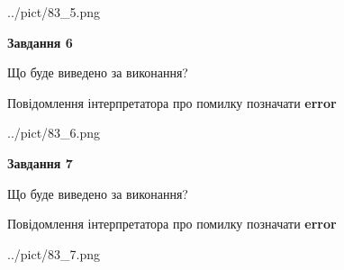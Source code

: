 \documentclass[10pt, ukrainian]{article}
\begin{document}
{\begin {large}
\begin{center}
	{../pict/83_5.png}
\end{center}
\newpage

{\begin {center}\textbf{Завдання 6}\end {center}}\par
Що буде виведено за виконання? \par
Повідомлення інтерпретатора про помилку позначати \textbf{error}

\begin{center}
	{../pict/83_6.png}
\end{center}
\newpage

{\begin {center}\textbf{Завдання 7}\end {center}}\par
Що буде виведено за виконання? \par
Повідомлення інтерпретатора про помилку позначати \textbf{error}

\begin{center}
	{../pict/83_7.png}
\end{center}
\newpage

\end {large}}
\end{document}

